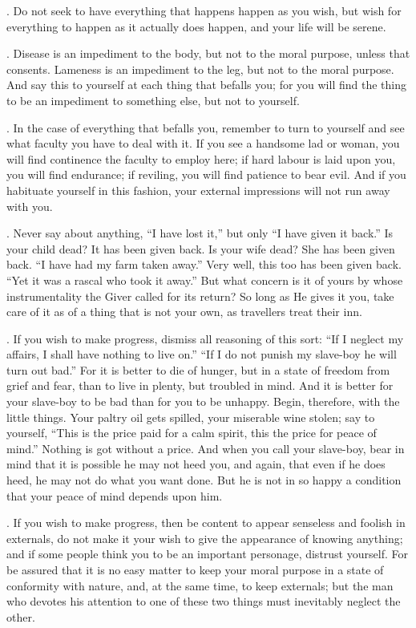 . Do not seek to have everything that happens happen as you wish, but wish for everything to happen as it actually does happen, and your life will be serene.

. Disease is an impediment to the body, but not to the moral purpose, unless that consents. Lameness is an impediment to the leg, but not to the moral purpose. And say this to yourself at each thing that befalls you; for you will find the thing to be an impediment to something else, but not to yourself.

. In the case of everything that befalls you, remember to turn to yourself and see what faculty you have to deal with it. If you see a handsome lad or woman, you will find continence the faculty to employ here; if hard labour is laid upon you, you will find endurance; if reviling, you will find patience to bear evil. And if you habituate yourself in this fashion, your external impressions will not run away with you.

. Never say about anything, ``I have lost it,'' but only ``I have given it back.'' Is your child dead? It has been given back. Is your wife dead? She has been given back. ``I have had my farm taken away.'' Very well, this too has been given back. ``Yet it was a rascal who took it away.'' But what concern is it of yours by whose instrumentality the Giver called for its return? So long as He gives it you, take care of it as of a thing that is not your own, as travellers treat their inn.

. If you wish to make progress, dismiss all reasoning of this sort: ``If I neglect my affairs, I shall have nothing to live on.'' ``If I do not punish my slave-boy he will turn out bad.'' For it is better to die of hunger, but in a state of freedom from grief and fear, than to live in plenty, but troubled in mind. And it is better for your slave-boy to be bad than for you to be unhappy. Begin, therefore, with the little things. Your paltry oil gets spilled, your miserable wine stolen; say to yourself, ``This is the price paid for a calm spirit, this the price for peace of mind.'' Nothing is got without a price. And when you call your slave-boy, bear in mind that it is possible he may not heed you, and again, that even if he does heed, he may not do what you want done. But he is not in so happy a condition that your peace of mind depends upon him.

. If you wish to make progress, then be content to appear senseless and foolish in externals, do not make it your wish to give the appearance of knowing anything; and if some people think you to be an important personage, distrust yourself. For be assured that it is no easy matter to keep your moral purpose in a state of conformity with nature, and, at the same time, to keep externals; but the man who devotes his attention to one of these two things must inevitably neglect the other.

